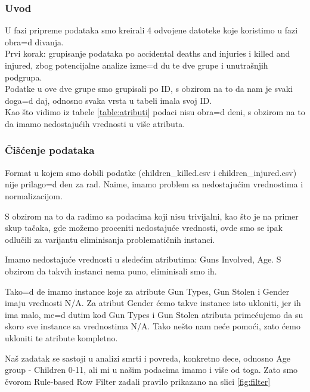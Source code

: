 \documentclass[12pt, a4paper]{article}
\def\dj{\leavevmode\setbox0=\hbox{d}\kern0pt
\rlap{\kern.215em\raise.46\ht0\hbox{-}}d}
\begin{document}
\subsubsection{Uvod}
U fazi pripreme podataka smo kreirali 4 odvojene datoteke koje koristimo u fazi obra\dj ivanja.\\
Prvi korak: grupisanje podataka po accidental deaths and injuries i killed and injured, zbog 
potencijalne analize izme\dj u te dve grupe i unutra\v snjih podgrupa.\\

Podatke u ove dve grupe smo grupisali po ID, s obzirom na to da nam je svaki doga\dj aj, odnosno svaka vrsta u tabeli imala svoj ID.\\

Kao \v sto vidimo iz tabele \ref{table:atributi} podaci nisu obra\dj eni, s obzirom na to da imamo nedostaju\' cih vrednosti u vi\v se atributa.\\

\subsubsection{\v Ci\v s\' cenje podataka}

Format u kojem smo dobili podatke (children\_killed.csv i children\_injured.csv) nije prilago\dj en za rad. Naime, imamo problem sa nedostaju\' cim vrednostima i normalizacijom.\break
 
S obzirom na to da radimo sa podacima koji nisu trivijalni, kao 
\v sto je na primer skup ta\v caka, gde mo\v zemo proceniti nedostaju\' ce vrednosti,
ovde smo se ipak odlu\v cili za varijantu eliminisanja problemati\v cnih instanci.\break

Imamo nedostaju\' ce vrednosti u slede\' cim atributima:
Guns Involved, Age. S obzirom da takvih instanci nema puno, eliminisali smo ih.

Tako\dj e imamo instance koje za atribute Gun Types, Gun Stolen i Gender imaju vrednosti N/A.
Za atribut Gender \' cemo takve instance isto ukloniti, jer ih ima malo, me\dj utim
kod Gun Types i Gun Stolen atributa prime\' cujemo da su skoro sve instance sa vrednostima N/A.
Tako ne\v sto nam ne\' ce pomo\' ci, zato \' cemo ukloniti te atribute kompletno.\break

Na\v s zadatak se sastoji u analizi smrti i povreda, konkretno dece, odnosno Age group - Children 0-11, ali mi u na\v sim podacima imamo i vi\v se od toga. Zato smo \v cvorom Rule-based Row Filter zadali pravilo prikazano na slici \ref{fig:filter}
\end{document}
